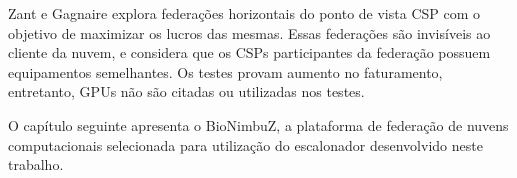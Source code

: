 Zant e Gagnaire \cite{6814036} explora federações horizontais do ponto de vista \acrfull{CSP} com o objetivo de maximizar os lucros das mesmas. Essas federações são invisíveis ao cliente da nuvem, e considera que os \acrshort{CSP}s participantes da federação possuem equipamentos semelhantes. Os testes provam aumento no faturamento, entretanto, \acrshort{GPU}s não são citadas ou utilizadas nos testes.


O capítulo seguinte apresenta o BioNimbuZ, a plataforma de federação de nuvens computacionais selecionada para utilização do escalonador desenvolvido neste trabalho.

